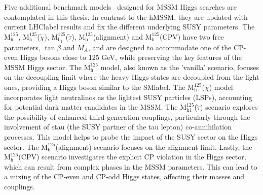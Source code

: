 Five additional benchmark models~\cite{Bagnaschi_2019} designed for MSSM Higgs searches are contemplated in this thesis. In contrast to the hMSSM, they are updated with current \acrshort{LHClabel} results and fix the different underlying SUSY parameters. The $\text{M}^{125}_\text{h}$, $\text{M}^{125}_\text{h}$($\tilde{\chi}$), $\text{M}^{125}_{\text{h}_1}$($\tilde{\tau}$), $\text{M}^{125}_\text{h}$(alignment) and $\text{M}^{125}_\text{h}$(CPV) have two free parameters, $\tan\beta$ and $M_A$, and are designed to accommodate one of the CP-even Higgs bosons close to 125 GeV, while preserving the key features of the MSSM Higgs sector. The $\text{M}^{125}_\text{h}$ model, also known as the 'vanilla' scenario, focuses on the decoupling limit where the heavy Higgs states are decoupled from the light ones, providing a Higgs boson similar to the \acrshort{SMlabel}. The $\text{M}^{125}_\text{h}$($\tilde{\chi}$) model incorporates light neutralinos as the lightest SUSY particles (LSPs), accounting for potential dark matter candidates in the MSSM. The $\text{M}^{125}_{\text{h}1}$($\tilde{\tau}$) scenario explores the possibility of enhanced third-generation couplings, particularly through the involvement of stau (the SUSY partner of the tau lepton) co-annihilation processes. This model helps to probe the impact of the SUSY sector on the Higgs sector. The $\text{M}^{125}_\text{h}$(alignment) scenario focuses on the alignment limit. Lastly, the $\text{M}^{125}_\text{h}$(CPV) scenario investigates the explicit CP violation in the Higgs sector, which can result from complex phases in the MSSM parameters. This can lead to a mixing of the CP-even and CP-odd Higgs states, affecting their masses and couplings.









